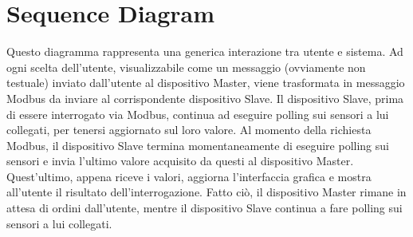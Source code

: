 \documentclass[a4paper,titlepage]{book}
\begin{document}
\newpage

\section{Sequence Diagram}

Questo diagramma rappresenta una generica interazione tra utente e sistema. Ad ogni scelta dell'utente, visualizzabile come un messaggio (ovviamente non testuale) inviato dall'utente al dispositivo Master, viene trasformata in messaggio Modbus da inviare al corrispondente dispositivo Slave. Il dispositivo Slave, prima di essere interrogato via Modbus, continua ad eseguire polling sui sensori a lui collegati, per tenersi aggiornato sul loro valore. Al momento della richiesta Modbus, il dispositivo Slave termina momentaneamente di eseguire polling sui sensori e invia l'ultimo valore acquisito da questi al dispositivo Master. Quest'ultimo, appena riceve i valori, aggiorna l'interfaccia grafica e mostra all'utente il risultato dell'interrogazione. Fatto ciò, il dispositivo Master rimane in attesa di ordini dall'utente, mentre il dispositivo Slave continua a fare polling sui sensori a lui collegati.

~
\end{document}
